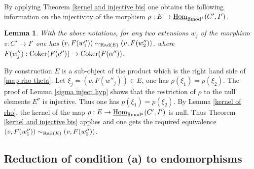 \documentclass[12pt]{article}
\newtheorem{lem}[thm]{Lemma}
\def\Homi{{\underline{\rm Hom}}}
\def\coker{{\rm Coker}}
\def\rad{{\rm Rad}}
\def\B{{\mathbb B}}
\def\b2{{\rm \B mod^{\mathfrak s}}}
\begin{document}
	 
	By applying Theorem \ref{kernel and injective bis} one obtains the following information on the injectivity of the  morphism  $\rho:E\to 
 	\Homi_\b2(C',I')$. 
	\begin{lem}\label{inject bis} With the above notations, for any two extensions $w_j$ of the morphism $v:C'\to I'$ one has
	$
	(v,F(w''_1))\sim_{\rad(E)}(v,F(w''_2))
	$, where $F(w''_j): \coker(F(c''))\to \coker(F(\alpha''))$.
 \end{lem}
	\proof By construction $E$ is a sub-object of the product which is the right hand side of \eqref{map rho theta}. Let $\xi_j=(v,F(w''_j))\in E$, one has $\rho(\xi_1)=\rho(\xi_2)$. The proof of Lemma \ref{sigma inject hyp} shows that the restriction of $\rho$ to the null elements $E^\sigma$ is injective. Thus one has $p(\xi_1)=p(\xi_2)$. By Lemma \ref{kernel of rho}, the kernel of the map $\rho:E\to 
 	\Homi_\b2(C',I')$ is null. Thus Theorem \ref{kernel and injective bis} applies and one gets the required equivalence $
	(v,F(w''_1))\sim_{\rad(E)}(v,F(w''_2))
	$.\endproof 

\subsection{Reduction of condition (a) to endomorphisms}\label{sect reduction to endo}
\end{document}
